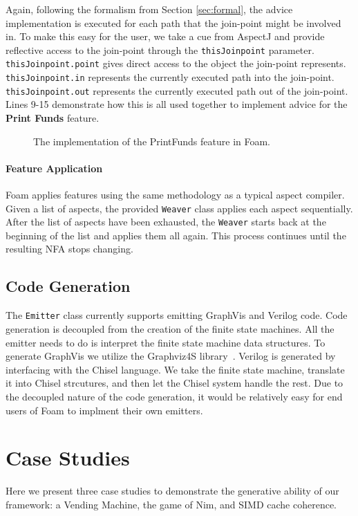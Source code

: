 \documentclass[sigplan,anonymous,review]{acmart}
\begin{document}
Again, following the formalism from Section \ref{sec:formal}, the advice implementation is executed for each path that the join-point might be involved in. To make this easy for the user, we take a cue from AspectJ and provide reflective access to the join-point through the \texttt{thisJoinpoint} parameter. \texttt{thisJoinpoint.point} gives direct access to the object the join-point represents. \texttt{thisJoinpoint.in} represents the currently executed path into the join-point. \texttt{thisJoinpoint.out} represents the currently executed path out of the join-point. Lines 9-15 demonstrate how this is all used together to implement advice for the \textbf{Print Funds} feature.

\begin{figure}
    \centering
    
    \caption{The implementation of the PrintFunds feature in Foam.}
    \label{lst:PrintFunds}
\end{figure}

\paragraph{Feature Application} Foam applies features using the same methodology as a typical aspect compiler. Given a list of aspects, the provided \texttt{Weaver} class applies each aspect sequentially. After the list of aspects have been exhausted, the \texttt{Weaver} starts back at the beginning of the list and applies them all again. This process continues until the resulting NFA stops changing. 

\subsection{Code Generation}
The \texttt{Emitter} class currently supports emitting GraphVis and Verilog code. Code generation is decoupled from the creation of the finite state machines. All the emitter needs to do is interpret the finite state machine data structures. To generate GraphVis we utilize the Graphviz4S library~\cite{}. Verilog is generated by interfacing with the Chisel language. We take the finite state machine, translate it into Chisel strcutures, and then let the Chisel system handle the rest. Due to the decoupled nature of the code generation, it would be relatively easy for end users of Foam to implment their own emitters.

\section{Case Studies}
Here we present three case studies to demonstrate the generative ability of our framework: a Vending Machine, the game of Nim, and SIMD cache coherence.
\end{document}
